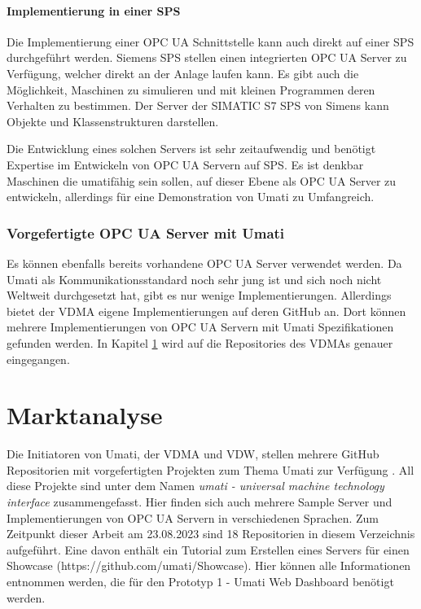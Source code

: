 \documentclass[a4paper, 12pt, oneside, toc=listofnumbered, bibliography=totoc]{scrbook}
\begin{document}
			\paragraph{Implementierung in einer SPS}
			Die Implementierung einer OPC UA Schnittstelle kann auch direkt auf einer SPS durchgeführt werden. Siemens SPS stellen einen integrierten OPC UA Server zu Verfügung, welcher direkt an der Anlage laufen kann. Es gibt auch die Möglichkeit, Maschinen zu simulieren und mit kleinen Programmen deren Verhalten zu bestimmen. Der Server der SIMATIC S7 SPS von Simens kann Objekte und Klassenstrukturen darstellen. \cite{noauthor_tia_2019}
			
			Die Entwicklung eines solchen Servers ist sehr zeitaufwendig und benötigt Expertise im Entwickeln von OPC UA Servern auf SPS. Es ist denkbar Maschinen die umatifähig sein sollen, auf dieser Ebene als OPC UA Server zu entwickeln, allerdings für eine Demonstration von Umati zu Umfangreich.
			
			\subsubsection{Vorgefertigte OPC UA Server mit Umati}
			
			Es können ebenfalls bereits vorhandene OPC UA Server verwendet werden. Da Umati als Kommunikationsstandard noch sehr jung ist und sich noch nicht Weltweit durchgesetzt hat, gibt es nur wenige Implementierungen. Allerdings bietet der VDMA eigene Implementierungen auf deren GitHub an. Dort können mehrere Implementierungen von OPC UA Servern mit Umati Spezifikationen gefunden werden. In Kapitel \ref{Marktanalyse} wird auf die Repositories des VDMAs genauer eingegangen.
	
	\section{Marktanalyse}\label{Marktanalyse}
		
		Die Initiatoren von Umati, der \ac{VDMA} und \ac{VDW}, stellen mehrere GitHub Repositorien mit vorgefertigten Projekten zum Thema Umati zur Verfügung \cite{noauthor_github_nodate}. All diese Projekte sind unter dem Namen \textit{umati - universal machine technology interface} zusammengefasst. Hier finden sich auch mehrere Sample Server und Implementierungen von OPC UA Servern in verschiedenen Sprachen. Zum Zeitpunkt dieser Arbeit am 23.08.2023 sind 18 Repositorien in diesem Verzeichnis aufgeführt. Eine davon enthält ein Tutorial zum Erstellen eines Servers für einen Showcase (https://github.com/umati/Showcase). Hier können alle Informationen entnommen werden, die für den Prototyp 1 - Umati Web Dashboard benötigt werden.
		
\end{document}
